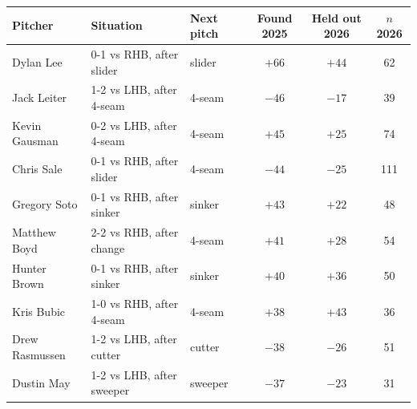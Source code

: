 \begin{tabular}{@{}lllccc@{}}\toprule
Pitcher & Situation & Next pitch & Found 2025 & Held out 2026 & $n$ 2026 \\\midrule
Dylan Lee & 0-1 vs RHB, after slider & slider & $+66$ & $+44$ & 62 \\
Jack Leiter & 1-2 vs LHB, after 4-seam & 4-seam & $-46$ & $-17$ & 39 \\
Kevin Gausman & 0-2 vs LHB, after 4-seam & 4-seam & $+45$ & $+25$ & 74 \\
Chris Sale & 0-1 vs RHB, after slider & 4-seam & $-44$ & $-25$ & 111 \\
Gregory Soto & 0-1 vs RHB, after sinker & sinker & $+43$ & $+22$ & 48 \\
Matthew Boyd & 2-2 vs RHB, after change & 4-seam & $+41$ & $+28$ & 54 \\
Hunter Brown & 0-1 vs RHB, after sinker & sinker & $+40$ & $+36$ & 50 \\
Kris Bubic & 1-0 vs RHB, after 4-seam & 4-seam & $+38$ & $+43$ & 36 \\
Drew Rasmussen & 1-2 vs LHB, after cutter & cutter & $-38$ & $-26$ & 51 \\
Dustin May & 1-2 vs LHB, after sweeper & sweeper & $-37$ & $-23$ & 31 \\
\bottomrule
\end{tabular}
